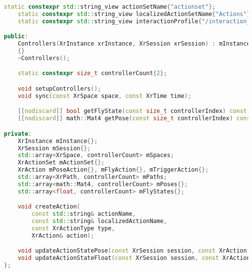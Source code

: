 \begin{itemize}
\begin{lstlisting}[language=c++, caption=Controllers header(./engine/src/core/controllers.h)]
    static constexpr std::string_view actionSetName{"actionset"};
    static constexpr std::string_view localizedActionSetName{"Actions"};
    static constexpr std::string_view interactionProfile{"/interaction_profiles/khr/simple_controller"};

public:
    Controllers(XrInstance xrInstance, XrSession xrSession) : mInstance(xrInstance), mSession(xrSession)
    {}
    ~Controllers();

    static constexpr size_t controllerCount{2};

    void setupControllers();
    void sync(const XrSpace space, const XrTime time);

    [[nodiscard]] bool getFlyState(const size_t controllerIndex) const { return mFlyStates.at(controllerIndex); }
    [[nodiscard]] math::Mat4 getPose(const size_t controllerIndex) const { return mPoses.at(controllerIndex); }

private:
    XrInstance mInstance{};
    XrSession mSession{};
    std::array<XrSpace, controllerCount> mSpaces;
    XrActionSet mActionSet{};
    XrAction mPoseAction{}, mFlyAction{}, mTriggerAction{};
    std::array<XrPath, controllerCount> mPaths;
    std::array<math::Mat4, controllerCount> mPoses{};
    std::array<float, controllerCount> mFlyStates{};

    void createAction(
        const std::string& actionName,
        const std::string& localizedActionName,
        const XrActionType type,
        XrAction& action);

    void updateActionStatePose(const XrSession session, const XrAction action, const XrPath path, XrActionStatePose& state);
    void updateActionStateFloat(const XrSession session, const XrAction action, const XrPath path, XrActionStateFloat& state);
};
\end{lstlisting}
\end{itemize}